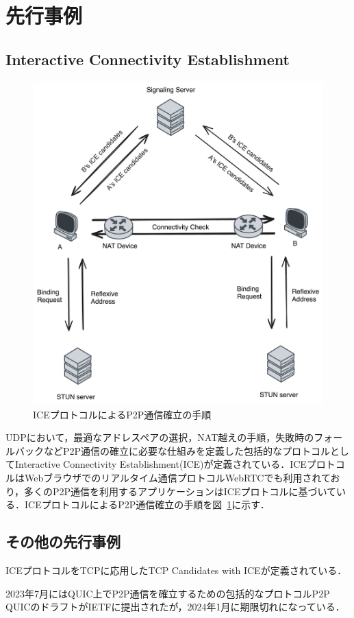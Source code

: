 \section{先行事例}
\subsection{Interactive Connectivity Establishment}
\begin{figure}[h]
  \centering
  \includegraphics[width=\linewidth]{figs/ice.png}
  \caption{ICEプロトコルによるP2P通信確立の手順}
  \label{fig:ice}
\end{figure}
UDPにおいて，最適なアドレスペアの選択，NAT越えの手順，失敗時のフォールバックなどP2P通信の確立に必要な仕組みを定義した包括的なプロトコルとしてInteractive Connectivity Establishment(ICE)\cite{rfc8445}が定義されている．ICEプロトコルはWebブラウザでのリアルタイム通信プロトコルWebRTC\cite{webrtc}でも利用されており，多くのP2P通信を利用するアプリケーションはICEプロトコルに基づいている．ICEプロトコルによるP2P通信確立の手順を図~\ref{fig:ice}に示す．

\subsection{その他の先行事例}
ICEプロトコルをTCPに応用したTCP Candidates with ICE\cite{rfc6544}が定義されている．

2023年7月にはQUIC上でP2P通信を確立するための包括的なプロトコルP2P QUIC\cite{p2p_quic}のドラフトがIETFに提出されたが，2024年1月に期限切れになっている．
